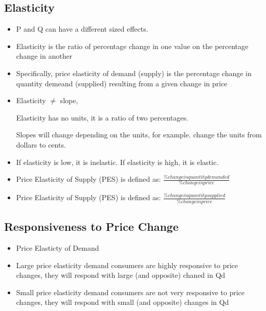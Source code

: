 \documentclass{article}
\begin{document}
\subsection{Elasticity}
\begin{itemize}
  \item P and Q can have a different sized effects.
  \item Elasticity is the ratio of percentage change in one value
    on the percentage change in another
  \item Specifically, price elasticity of demand (supply) is the percentage change
    in quantity demeand (supplied) resulting from a given change in price
  \item Elasticity $\neq$ slope,

    Elasticity has no units, it is a ratio of two percentages.

    Slopes will change depending on the units, for example.
    change the units from dollars to cents.
  \item If elasticity is low, it is inelastic.
    If elasticity is high, it is elastic.
  \item Price Elasticity of Supply (PES) is defined as:
    $\frac{\% change in quantity demanded}{\% change in price}$
  \item Price Elasticity of Supply (PES) is defined as:
    $\frac{\% change in quantity supplied}{\% change in price}$
\end{itemize}

\subsection{Responsiveness to Price Change}
\begin{itemize}
  \item Price Elasticty of Demand
  \item Large price elasticity demand \rightarrow{} consumers are highly responsive to price changes,
    they will respond with large (and opposite) chaned in Qd
  \item Small price elasticity demand \rightarrow{} consumers are not very responsive to price changes,
    they will respond with small (and opposite) changes in Qd
\end{itemize}
\end{document}
